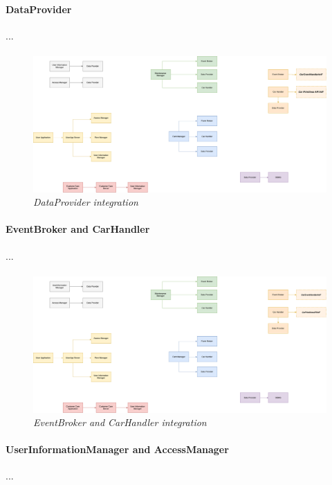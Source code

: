 \paragraph{DataProvider} 
...
\paragraph{}

		\begin{figure}[h]
			\centering
			\includegraphics[width=0.6\linewidth]{img/Integration1}
			\caption{
				\label{fig:dataProvider} 
				\emph{DataProvider integration}
			}
		\end{figure}

\paragraph{EventBroker and CarHandler} 
...
\paragraph{}
		
		\begin{figure}[h]
			\centering
			\includegraphics[width=0.6\linewidth]{img/Integration2a}
			\caption{
				\label{fig:eventBrokerCarHandler} 
				\emph{EventBroker and CarHandler integration}
			}
		\end{figure}

\paragraph{UserInformationManager and AccessManager} 
...
\paragraph{}
		
